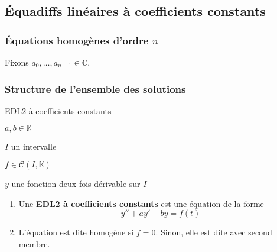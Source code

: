 \subsection{Équadiffs linéaires à coefficients constants}

    \subsubsection{Équations homogènes d’ordre $n$}

    Fixons $a_0, \ldots, a_{n-1} \in \mathbb{C}$.

    \subsubsection{Structure de l’ensemble des solutions}

    \begin{defi}{EDL2 à coefficients constants}{}
	    \begin{soient}
		    \item $a,b \in \mathbb{K}$
		    \item $I$ un intervalle
		    \item $f \in \mathcal{C}(I,\mathbb{K})$
		    \item $y$ une fonction deux fois dérivable sur $I$
	    \end{soient}
	    \begin{enumerate}
		    \item Une \textbf{EDL2 à coefficients constants} est une équation de la forme \[ y'' + ay' + by = f(t) \]
		    \item L’équation est dite homogène si $f = 0$. Sinon, elle est dite avec second membre.
	    \end{enumerate}
    \end{defi}

